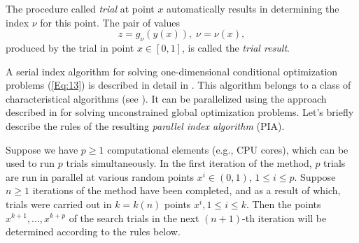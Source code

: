 \documentclass{llncs}
\begin{document}
The procedure called \textit{trial} at point  $x$  automatically results in determining the index $\nu$ for this point. The pair of values  
\begin{equation}\label{Eq:16}
z=g_\nu(y(x)), \; \nu = \nu (x),
\end{equation}
produced by the trial in point $x \in [0,1]$, is called the \textit{trial result}.

A serial index algorithm for solving one-dimensional conditional optimization problems (\ref{Eq:13}) is described in detail in \cite{Barkalov2002}. This algorithm belongs to a class of characteristical algorithms (see \cite{Grishagin1997}). It can be parallelized using the approach described in \cite{Grishagin1997} for solving unconstrained global optimization problems. Let's briefly describe the rules of the resulting \textit{parallel index algorithm} (PIA).

Suppose we have $p \geq 1$  computational elements (e.g., CPU cores), which can be used to run $p$ trials simultaneously. In the first iteration of the method, $p$ trials are run in parallel at various random points $x^i\in(0,1)$, $1\leq i \leq p$. 
Suppose $n \geq 1$  iterations of the method have been completed, and as a result of which, trials were carried out in $k=k(n)$ points $x^i, 1\leq i \leq k$. Then the points $x^{k+1},...,x^{k+p}$  of the search trials in the next $(n+1)$-th iteration will be determined according to the rules below.
\end{document}
